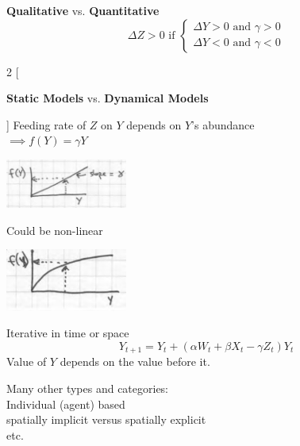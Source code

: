 \documentclass{article}
\begin{document}
\begin{center}
	\textbf{Qualitative} vs. \textbf{Quantitative}\\
	\begin{equation*}
		\Delta Z > 0 \text{ if } 
		\begin{cases}
			\Delta Y > 0 \text{ and } \gamma > 0 \\
			\Delta Y < 0 \text{ and } \gamma < 0
		\end{cases}
	\end{equation*}
	
\end{center}

\begin{multicols}{2}
	[
	\begin{center}
		\textbf{Static Models} vs. 	\textbf{Dynamical Models}
	\end{center}
	]
		\setlength{\columnseprule}{0.2pt}
	Feeding rate of $Z$ on $Y$ depends on $Y$'s abundance\\
	$\implies f(Y) = \gamma Y$
	
\begin{center}
	\includegraphics[width=4cm]{figs/img1}
\end{center}

	Could be non-linear
	\begin{center}
		\includegraphics[width=4cm]{figs/img2}
	\end{center}
		
	\columnbreak
	
	Iterative in time or space
	\begin{equation*}
		Y_{t+1} = Y_t +( \alpha W_t + \beta X_t - \gamma Z_t  ) Y_t
	\end{equation*}
	Value of $Y$ depends on the value before it.
	
\end{multicols}

Many other types and categories: \\
\-\hspace{1cm}	Individual (agent) based\\
\-\hspace{1cm}	spatially implicit versus spatially explicit\\
\-\hspace{1cm}	etc.\\
\end{document}

